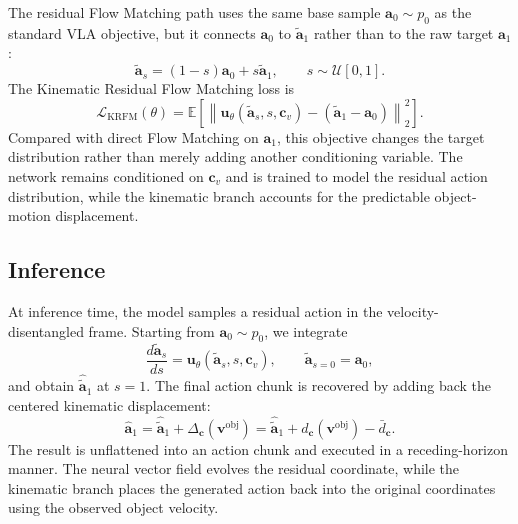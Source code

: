\documentclass[10pt,twocolumn,letterpaper]{article}
\begin{document}
The residual Flow Matching path uses the same base sample $\mathbf a_0\sim p_0$
as the standard VLA objective, but it connects $\mathbf a_0$ to
$\widetilde{\mathbf a}_1$ rather than to the raw target $\mathbf a_1$:
\[
    \widetilde{\mathbf a}_s
    =
    (1-s)\mathbf a_0+s\widetilde{\mathbf a}_1,
    \qquad
    s\sim\mathcal U[0,1].
\]
The Kinematic Residual Flow Matching loss is
\begin{equation}
    \mathcal L_{\mathrm{KRFM}}(\theta)
    =
    \mathbb E
    \left[
        \left\|
            \mathbf u_\theta(\widetilde{\mathbf a}_s,s,\mathbf c_v)
            -
            (\widetilde{\mathbf a}_1-\mathbf a_0)
        \right\|_2^2
    \right].
    \label{eq:krfm_loss}
\end{equation}
Compared with direct Flow Matching on $\mathbf a_1$, this objective changes the
target distribution rather than merely adding another conditioning variable. The
network remains conditioned on $\mathbf c_v$ and is trained to model the residual action distribution, while the
kinematic branch accounts for the predictable object-motion displacement.

\subsection{Inference}
\label{subsec:inference}

At inference time, the model samples a residual action in the
velocity-disentangled frame. Starting from $\mathbf a_0\sim p_0$, we integrate
\[
    \frac{d\widetilde{\mathbf a}_s}{ds}
    =
    \mathbf u_\theta(\widetilde{\mathbf a}_s,s,\mathbf c_v),
    \qquad
    \widetilde{\mathbf a}_{s=0}=\mathbf a_0,
\]
and obtain $\widehat{\widetilde{\mathbf a}}_1$ at $s=1$. The final action chunk
is recovered by adding back the centered kinematic displacement:
\begin{equation}
    \widehat{\mathbf a}_1
    =
    \widehat{\widetilde{\mathbf a}}_1
    +
    \Delta_{\mathbf c}(\mathbf v^{\mathrm{obj}})
    =
    \widehat{\widetilde{\mathbf a}}_1
    +
    d_{\mathbf c}(\mathbf v^{\mathrm{obj}})
    -
    \bar d_{\mathbf c}.
    \label{eq:residual_to_raw_inference}
\end{equation}
The result is unflattened into an action chunk and executed in a
receding-horizon manner. The neural vector field evolves the residual
coordinate, while the kinematic branch places the generated action back into
the original coordinates using the observed object velocity.
\end{document}
